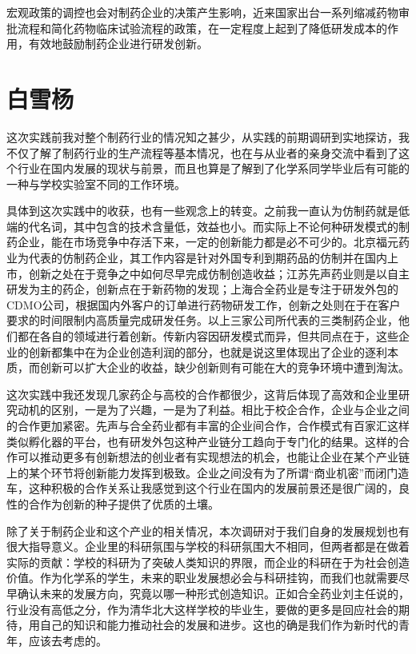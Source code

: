 宏观政策的调控也会对制药企业的决策产生影响，近来国家出台一系列缩减药物审批流程和简化药物临床试验流程的政策，在一定程度上起到了降低研发成本的作用，有效地鼓励制药企业进行研发创新。


\section*{白雪杨}
这次实践前我对整个制药行业的情况知之甚少，从实践的前期调研到实地探访，我不仅了解了制药行业的生产流程等基本情况，也在与从业者的亲身交流中看到了这个行业在国内发展的现状与前景，而且也算是了解到了化学系同学毕业后有可能的一种与学校实验室不同的工作环境。

具体到这次实践中的收获，也有一些观念上的转变。之前我一直认为仿制药就是低端的代名词，其中包含的技术含量低，效益也小。而实际上不论何种研发模式的制药企业，能在市场竞争中存活下来，一定的创新能力都是必不可少的。北京福元药业为代表的仿制药企业，其工作内容是针对外国专利到期药品的仿制并在国内上市，创新之处在于竞争之中如何尽早完成仿制创造收益；江苏先声药业则是以自主研发为主的药企，创新点在于新药物的发现；上海合全药业是专注于研发外包的CDMO公司，根据国内外客户的订单进行药物研发工作，创新之处则在于在客户要求的时间限制内高质量完成研发任务。以上三家公司所代表的三类制药企业，他们都在各自的领域进行着创新。传新内容因研发模式而异，但共同点在于，这些企业的创新都集中在为企业创造利润的部分，也就是说这里体现出了企业的逐利本质，而创新可以扩大企业的收益，缺少创新则有可能在大的竞争环境中遭到淘汰。

这次实践中我还发现几家药企与高校的合作都很少，这背后体现了高效和企业里研究动机的区别，一是为了兴趣，一是为了利益。相比于校企合作，企业与企业之间的合作更加紧密。先声与合全药业都有丰富的企业间合作，合作模式有百家汇这样类似孵化器的平台，也有研发外包这种产业链分工趋向于专门化的结果。这样的合作可以推动更多有创新想法的创业者有实现想法的机会，也能让企业在某个产业链上的某个环节将创新能力发挥到极致。企业之间没有为了所谓“商业机密”而闭门造车，这种积极的合作关系让我感觉到这个行业在国内的发展前景还是很广阔的，良性的合作为创新的种子提供了优质的土壤。

除了关于制药企业和这个产业的相关情况，本次调研对于我们自身的发展规划也有很大指导意义。企业里的科研氛围与学校的科研氛围大不相同，但两者都是在做着实际的贡献：学校的科研为了突破人类知识的界限，而企业的科研在于为社会创造价值。作为化学系的学生，未来的职业发展想必会与科研挂钩，而我们也就需要尽早确认未来的发展方向，究竟以哪一种形式创造知识。正如合全药业刘主任说的，行业没有高低之分，作为清华北大这样学校的毕业生，要做的更多是回应社会的期待，用自己的知识和能力推动社会的发展和进步。这也的确是我们作为新时代的青年，应该去考虑的。

